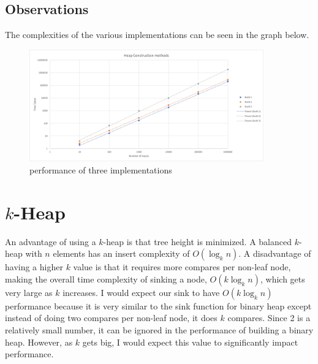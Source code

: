 \documentclass[12pt]{article}
\begin{document}
\subsection{Observations}
The complexities of the various implementations can be seen in the graph below.
\begin{figure}[H]
\centering
\includegraphics[width=0.9\textwidth,height=\textheight,keepaspectratio]{heap}
\caption{performance of three implementations}
\label{Figure: m1}
\end{figure}


\section{$k$-Heap}
An advantage of using a $k$-heap is that tree height is minimized. A balanced $k$-heap with $n$ elements has an insert complexity of $O(\log_k{n})$. A disadvantage of having a higher $k$ value is that it requires more compares per non-leaf node, making the overall time complexity of sinking a node, $O(k\log_k{n})$, which gets very large as $k$ increases.
I would expect our sink to have $O(k\log_k{n})$ performance because it is very similar to the sink function for binary heap except instead of doing two compares per non-leaf node, it does $k$ compares. Since 2 is a relatively small number, it can be ignored in the performance of building a binary heap. However, as $k$ gets big, I would expect this value to significantly impact performance.
\end{document}
